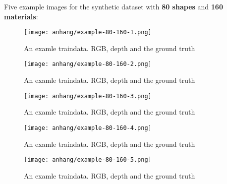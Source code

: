 	\FloatBarrier
	\clearpage
	Five example images for the synthetic dataset with \textbf{80 shapes} and \textbf{160 materials}:
	\begin{figure}[H]
		\centering
		\texttt{[image: anhang/example-80-160-1.png]}
		\caption[An examle traindata. RGB, depth and the ground truth]{An examle traindata. RGB, depth and the ground truth}
	\end{figure}
	\begin{figure}[H]
		\centering
		\texttt{[image: anhang/example-80-160-2.png]}
		\caption[An examle traindata. RGB, depth and the ground truth]{An examle traindata. RGB, depth and the ground truth}
	\end{figure}
	\begin{figure}[H]
		\centering
		\texttt{[image: anhang/example-80-160-3.png]}
		\caption[An examle traindata. RGB, depth and the ground truth]{An examle traindata. RGB, depth and the ground truth}
	\end{figure}
	\begin{figure}[H]
		\centering
		\texttt{[image: anhang/example-80-160-4.png]}
		\caption[An examle traindata. RGB, depth and the ground truth]{An examle traindata. RGB, depth and the ground truth}
	\end{figure}
	\begin{figure}[H]
		\centering
		\texttt{[image: anhang/example-80-160-5.png]}
		\caption[An examle traindata. RGB, depth and the ground truth]{An examle traindata. RGB, depth and the ground truth}
	\end{figure}
	
